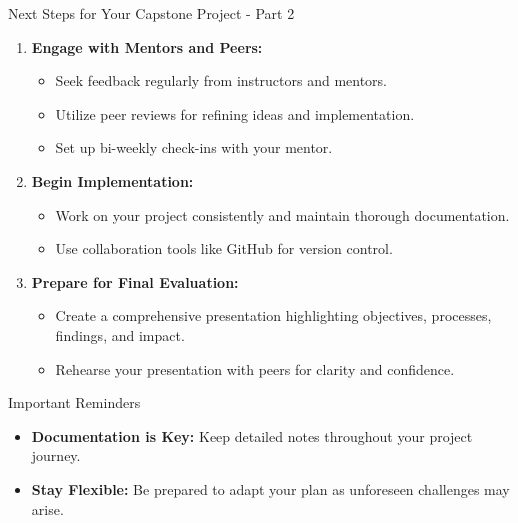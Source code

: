 \documentclass[aspectratio=169]{beamer}
\begin{document}
\begin{frame}[fragile]{Next Steps for Your Capstone Project - Part 2}
  \begin{enumerate}[resume]
    \item \textbf{Engage with Mentors and Peers:}
      \begin{itemize}
        \item Seek feedback regularly from instructors and mentors.
        \item Utilize peer reviews for refining ideas and implementation.
        \item Set up bi-weekly check-ins with your mentor.
      \end{itemize}

    \item \textbf{Begin Implementation:}
      \begin{itemize}
        \item Work on your project consistently and maintain thorough documentation.
        \item Use collaboration tools like GitHub for version control.
      \end{itemize}

    \item \textbf{Prepare for Final Evaluation:}
      \begin{itemize}
        \item Create a comprehensive presentation highlighting objectives, processes, findings, and impact.
        \item Rehearse your presentation with peers for clarity and confidence.
      \end{itemize}
  \end{enumerate}
  
  \begin{block}{Important Reminders}
    \begin{itemize}
      \item \textbf{Documentation is Key:} Keep detailed notes throughout your project journey.
      \item \textbf{Stay Flexible:} Be prepared to adapt your plan as unforeseen challenges may arise.
    \end{itemize}
  \end{block}
\end{frame}
\end{document}

